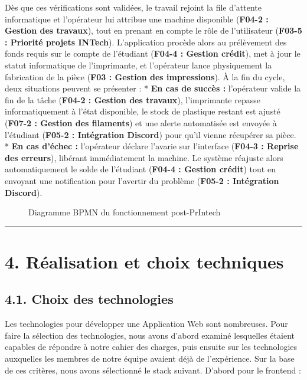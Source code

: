Dès que ces vérifications sont validées, le travail rejoint la file
d'attente informatique et l'opérateur lui attribue une machine
disponible (\textbf{F04-2 : Gestion des travaux}), tout en prenant en
compte le rôle de l'utilisateur (\textbf{F03-5 : Priorité projets
INTech}). L'application procède alors au prélèvement des fonds requis
sur le compte de l'étudiant (\textbf{F04-4 : Gestion crédit}), met à
jour le statut informatique de l'imprimante, et l'opérateur lance
physiquement la fabrication de la pièce (\textbf{F03 : Gestion des
impressions}). À la fin du cycle, deux situations peuvent se présenter :
* \textbf{En cas de succès :} l'opérateur valide la fin de la tâche
(\textbf{F04-2 : Gestion des travaux}), l'imprimante repasse
informatiquement à l'état disponible, le stock de plastique restant est
ajusté (\textbf{F07-2 : Gestion des filaments}) et une alerte
automatisée est envoyée à l'étudiant (\textbf{F05-2 : Intégration
Discord}) pour qu'il vienne récupérer sa pièce. * \textbf{En cas d'échec
:} l'opérateur déclare l'avarie sur l'interface (\textbf{F04-3 : Reprise
des erreurs}), libérant immédiatement la machine. Le système réajuste
alors automatiquement le solde de l'étudiant (\textbf{F04-4 : Gestion
crédit}) tout en envoyant une notification pour l'avertir du problème
(\textbf{F05-2 : Intégration Discord}).

\begin{figure}
\centering

\caption{Diagramme BPMN du fonctionnement post-PrIntech}
\end{figure}

\begin{center}\rule{0.5\linewidth}{0.5pt}\end{center}

\newpage

\hypertarget{ruxe9alisation-et-choix-techniques}{%
\section{4. Réalisation et choix
techniques}\label{ruxe9alisation-et-choix-techniques}}

\hypertarget{choix-des-technologies}{%
\subsection{4.1. Choix des technologies}\label{choix-des-technologies}}

Les technologies pour développer une Application Web sont nombreuses.
Pour faire la sélection des technologies, nous avons d'abord examiné
lesquelles étaient capables de répondre à notre cahier des charges, puis
ensuite sur les technologies auxquelles les membres de notre équipe
avaient déjà de l'expérience. Sur la base de ces critères, nous avons
sélectionné le stack suivant. D'abord pour le frontend :

